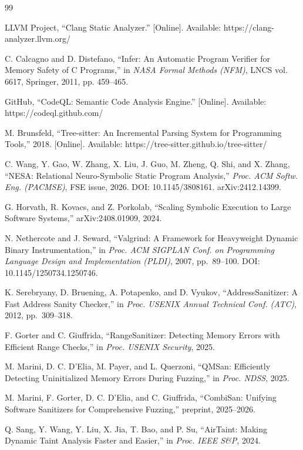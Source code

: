\documentclass[11pt,a4paper]{article}
\begin{document}
\begin{thebibliography}{99}

 LLVM Project, ``Clang Static Analyzer.'' [Online]. Available: https://clang-analyzer.llvm.org/

 C. Calcagno and D. Distefano, ``Infer: An Automatic Program Verifier for Memory Safety of C Programs,'' in \textit{NASA Formal Methods (NFM)}, LNCS vol. 6617, Springer, 2011, pp. 459--465.

 GitHub, ``CodeQL: Semantic Code Analysis Engine.'' [Online]. Available: https://codeql.github.com/

 M. Brunsfeld, ``Tree-sitter: An Incremental Parsing System for Programming Tools,'' 2018. [Online]. Available: https://tree-sitter.github.io/tree-sitter/

 C. Wang, Y. Gao, W. Zhang, X. Liu, J. Guo, M. Zheng, Q. Shi, and X. Zhang, ``NESA: Relational Neuro-Symbolic Static Program Analysis,'' \textit{Proc. ACM Softw. Eng. (PACMSE)}, FSE issue, 2026. DOI: 10.1145/3808161. arXiv:2412.14399.

 G. Horvath, R. Kovacs, and Z. Porkolab, ``Scaling Symbolic Execution to Large Software Systems,'' arXiv:2408.01909, 2024.

 N. Nethercote and J. Seward, ``Valgrind: A Framework for Heavyweight Dynamic Binary Instrumentation,'' in \textit{Proc. ACM SIGPLAN Conf. on Programming Language Design and Implementation (PLDI)}, 2007, pp.~89--100. DOI: 10.1145/1250734.1250746.

 K. Serebryany, D. Bruening, A. Potapenko, and D. Vyukov, ``AddressSanitizer: A Fast Address Sanity Checker,'' in \textit{Proc. USENIX Annual Technical Conf. (ATC)}, 2012, pp.~309--318.

 F. Gorter and C. Giuffrida, ``RangeSanitizer: Detecting Memory Errors with Efficient Range Checks,'' in \textit{Proc. USENIX Security}, 2025.

 M. Marini, D. C. D'Elia, M. Payer, and L. Querzoni, ``QMSan: Efficiently Detecting Uninitialized Memory Errors During Fuzzing,'' in \textit{Proc. NDSS}, 2025.

 M. Marini, F. Gorter, D. C. D'Elia, and C. Giuffrida, ``CombiSan: Unifying Software Sanitizers for Comprehensive Fuzzing,'' preprint, 2025--2026.

 Q. Sang, Y. Wang, Y. Liu, X. Jia, T. Bao, and P. Su, ``AirTaint: Making Dynamic Taint Analysis Faster and Easier,'' in \textit{Proc. IEEE S\&P}, 2024.


\end{thebibliography}
\end{document}
